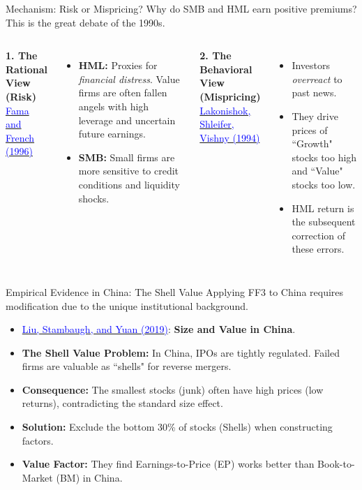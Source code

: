 \documentclass{beamer}
\begin{document}
\begin{frame}{Mechanism: Risk or Mispricing?}
	Why do SMB and HML earn positive premiums? This is the great debate of the 1990s.
	\vspace{5pt}
	\begin{columns}
		\textbf{1. The Rational View (Risk)} \\
		\href{https://doi.org/10.1111/j.1540-6261.1996.tb05202.x}{\textcolor{blue}{Fama and French (1996)}}
		\begin{itemize}
			\item \textbf{HML:} Proxies for \textit{financial distress}. Value firms are often fallen angels with high leverage and uncertain future earnings.
			\item \textbf{SMB:} Small firms are more sensitive to credit conditions and liquidity shocks.
		\end{itemize}
		
		\textbf{2. The Behavioral View (Mispricing)} \\
		\href{10.1111/j.1540-6261.1994.tb04772.x}{\textcolor{blue}{Lakonishok, Shleifer, Vishny (1994)}}
		\begin{itemize}
			\item Investors \textit{overreact} to past news.
			\item They drive prices of ``Growth" stocks too high and ``Value" stocks too low.
			\item HML return is the subsequent correction of these errors.
		\end{itemize}
	\end{columns}
\end{frame}

\begin{frame}{Empirical Evidence in China: The Shell Value}
	Applying FF3 to China requires modification due to the unique institutional background.
	
	\begin{itemize}
		\item \href{https://doi.org/10.1016/j.jfineco.2019.03.008}{\textcolor{blue}{Liu, Stambaugh, and Yuan (2019)}}: \textbf{Size and Value in China}.
		\item \textbf{The Shell Value Problem:} In China, IPOs are tightly regulated. Failed firms are valuable as ``shells" for reverse mergers.
		\item \textbf{Consequence:} The smallest stocks (junk) often have high prices (low returns), contradicting the standard size effect.
		\item \textbf{Solution:} Exclude the bottom 30\% of stocks (Shells) when constructing factors.
		\item \textbf{Value Factor:} They find Earnings-to-Price (EP) works better than Book-to-Market (BM) in China.
	\end{itemize}
\end{frame}
\end{document}
